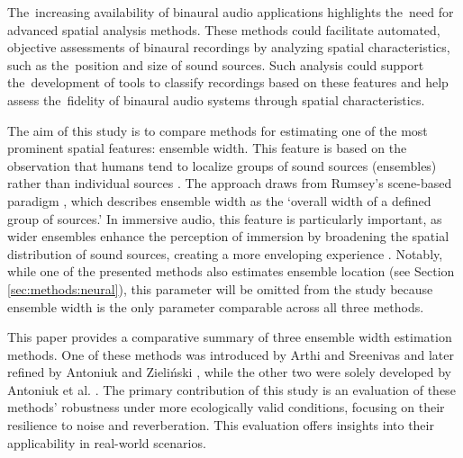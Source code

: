 The~increasing availability of binaural audio applications highlights the~need for advanced spatial analysis methods. These methods could facilitate automated, objective assessments of binaural recordings by analyzing spatial characteristics, such as the~position and size of sound sources. Such analysis could support the~development of tools to classify recordings based on these features and help assess the~fidelity of binaural audio systems through spatial characteristics.

The aim of this study is to compare methods for estimating one of the most prominent spatial features: ensemble width. This feature is based on the observation that humans tend to localize groups of sound sources (ensembles) rather than individual sources \cite{bregman_auditory_1990, rumsey_spatial_2002}. The approach draws from Rumsey's scene-based paradigm \cite{rumsey_spatial_2002}, which describes ensemble width as the `overall width of a defined group of sources.' In immersive audio, this feature is particularly important, as wider ensembles enhance the perception of immersion by broadening the spatial distribution of sound sources, creating a more enveloping experience \cite{griesinger_psychoacoustics_1997}. Notably, while one of the presented methods also estimates ensemble location (see Section \ref{sec:methods:neural}), this parameter will be omitted from the study because ensemble width is the only parameter comparable across all three methods.

This paper provides a comparative summary of three ensemble width estimation methods. One of these methods was introduced by Arthi and Sreenivas \cite{arthi_binaural_2022} and later refined by Antoniuk and Zieliński \cite{antoniuk_blind_2023}, while the other two were solely developed by Antoniuk et al. \cite{antoniuk_ensemble_2024, antoniuk_estimating_2024}. The primary contribution of this study is an evaluation of these methods' robustness under more ecologically valid conditions, focusing on their resilience to noise and reverberation. This evaluation offers insights into their applicability in real-world scenarios.

%
%

